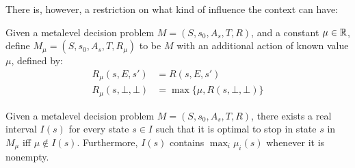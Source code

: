 There is, however, a restriction on what kind of influence the context can have:

\begin{dfn}\label{dfn:context}
	Given a metalevel decision problem $M=(S,s_0,A_s,T,R)$, and a constant $\mu\in\mathbb{R}$,
	define $M_\mu = (S,s_0,A_s,T,R_\mu)$ to be $M$ with an additional action of known 
	value $\mu$, defined by:
	\begin{align*}
		R_\mu(s,E,s')      &= R(s,E,s') \\
		R_\mu(s,\bot,\bot) &= \max\{\mu, R(s,\bot,\bot)\}
	\end{align*}
\end{dfn}

\begin{thm}
	Given a metalevel decision problem $M=(S,s_0,A_s,T,R)$, 
	there exists a real interval $I(s)$ for every state $s\in I$ such that
	it is optimal to stop in state $s$ in $M_\mu$ iff $\mu\notin I(s)$.
	Furthermore, $I(s)$ contains $\max_i\mu_i(s)$ whenever it is nonempty.
\end{thm}

